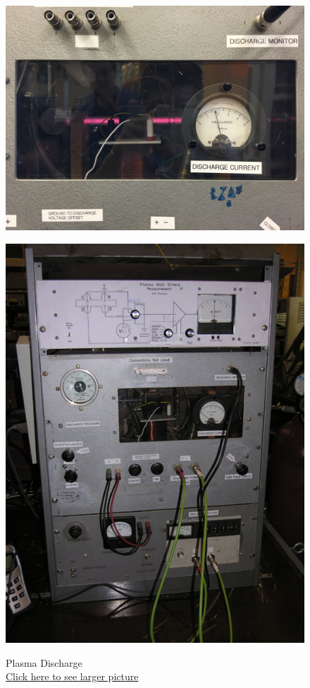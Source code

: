 \documentclass{../lab}
\begin{document}
\begin{figure}[H]
\captionsetup{justification=centering}
  \href{http://experimentationlab.berkeley.edu/sites/default/files/images/HAL_Plasma_3570_HD.jpg}{\includegraphics[width=\linewidth,keepaspectratio]{images/HAL_Plasma_3570_HD.jpg}}
  \caption{Plasma Discharge \\ \href{http://experimentationlab.berkeley.edu/sites/default/files/images/HAL_Plasma_3570_HD.jpg}{Click here to see larger picture}}\label{fig:HAL_Plasma_3570.jpg}
\endminipage\hfill
{}
  \href{http://experimentationlab.berkeley.edu/sites/default/files/images/HAL_0153B.jpg}{\includegraphics[width=\linewidth,keepaspectratio]{images/HAL_0153B.jpg}}

\end{figure}
\end{document}
